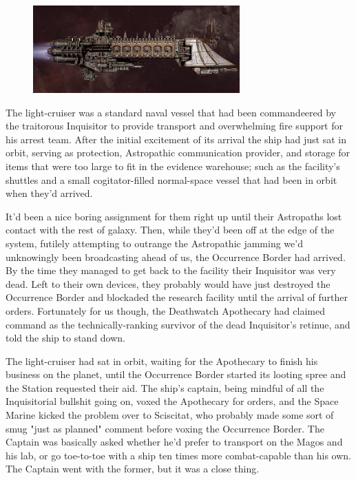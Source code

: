 \begin{figure}
	\begin{center}
		\includegraphics[width=\figwidth]{pics/17/10.png}
	\end{center}
\end{figure}
The light-cruiser was a standard naval vessel that had been commandeered by the traitorous Inquisitor to provide transport and overwhelming fire support for his arrest team. 
After the initial excitement of its arrival the ship had just sat in orbit, serving as protection, Astropathic communication provider, and storage for items that were too large to fit in the evidence warehouse; 
such as the facility's shuttles and a small cogitator-filled normal-space vessel that had been in orbit when they'd arrived. 


It'd been a nice boring assignment for them right up until their Astropaths lost contact with the rest of galaxy. 
Then, while they'd been off at the edge of the system, futilely attempting to outrange the Astropathic jamming we'd unknowingly been broadcasting ahead of us, the Occurrence Border had arrived. 
By the time they managed to get back to the facility their Inquisitor was very dead. 
Left to their own devices, they probably would have just destroyed the Occurrence Border and blockaded the research facility until the arrival of further orders. 
Fortunately for us though, the Deathwatch Apothecary had claimed command as the technically-ranking survivor of the dead Inquisitor's retinue, and told the ship to stand down. 


The light-cruiser had sat in orbit, waiting for the Apothecary to finish his business on the planet, until the Occurrence Border started its looting spree and the Station requested their aid. 
The ship's captain, being mindful of all the Inquisitorial bullshit going on, voxed the Apothecary for orders, and the Space Marine kicked the problem over to Sciscitat, who probably made some sort of smug "just as planned" comment before voxing the Occurrence Border. 
The Captain was basically asked whether he'd prefer to transport on the Magos and his lab, or go toe-to-toe with a ship ten times more combat-capable than his own. 
The Captain went with the former, but it was a close thing.


